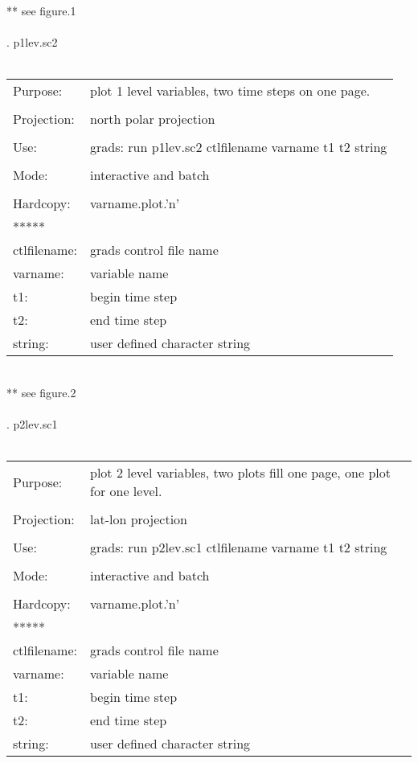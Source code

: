 ** see figure.1  
\\
\\
. p1lev.sc2 \\ \\
\begin{tabular}{ll}
Purpose:    &   plot 1 level variables, two time steps on one page.         \\
\\
Projection: &   north polar projection                                      \\
\\
Use:	    &   grads: run p1lev.sc2 ctlfilename varname t1 t2 string       \\
\\
Mode:       &   interactive and batch                                       \\
\\
Hardcopy:   &   varname.plot.'n'                                            \\
*****  \\
ctlfilename: &  grads control file name                  \\
varname:     &  variable name                    \\
t1:       &  begin time step     \\
t2:       &  end time step        \\
string:   &   user defined character string  
\end{tabular}
\\
** see figure.2  
\\ 
\\
\newpage
{}. p2lev.sc1 \\ \\
\begin{tabular}{ll}
Purpose:     &  plot 2 level variables, two plots fill one page, one plot for one level.\\
\\
Projection:  &  lat-lon projection                                                     \\
\\
Use:         &  grads: run p2lev.sc1 ctlfilename varname t1 t2  string                 \\
\\
Mode:        &  interactive and batch                                                  \\
\\
Hardcopy:    &  varname.plot.'n'                                                       \\
*****  \\
ctlfilename: &  grads control file name    \\ 
varname:     &  variable name      \\ 
t1:       &  begin time step    \\
t2:       &  end time step  \\
string:   &   user defined character string  
\end{tabular}

